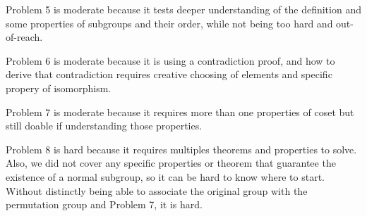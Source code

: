 \documentclass[12pt]{article}
\begin{document}
    Problem 5 is moderate because it tests deeper understanding of the definition and some properties of subgroups and their order, while not being too hard and out-of-reach.
    
    Problem 6 is moderate because it is using a contradiction proof, and how to derive that contradiction requires creative choosing of elements and specific propery of isomorphism.
    
    Problem 7 is moderate because it requires more than one properties of coset but still doable if understanding those properties.
    
    Problem 8 is hard because it requires multiples theorems and properties to solve. Also, we did not cover any specific properties or theorem that guarantee the existence of a normal subgroup, so it can be hard to know where to start.
    Without distinctly being able to associate the original group with the permutation group and Problem 7, it is hard.
\end{document}
